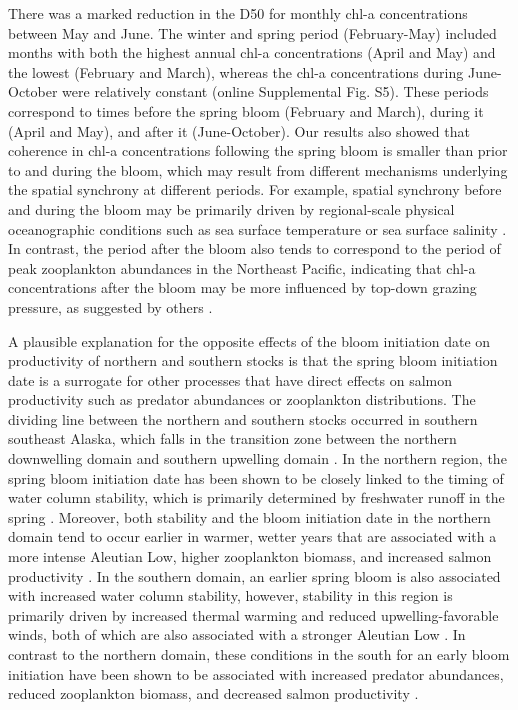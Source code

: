 There was a marked reduction in the D50 for monthly chl-a concentrations between
May and June. The winter and spring period (February-May) included months with
both the highest annual chl-a concentrations (April and May) and the lowest
(February and March), whereas the chl-a concentrations during June-October were
relatively constant (online Supplemental Fig. S5). These periods correspond to
times before the spring bloom (February and March), during it (April and May),
and after it (June-October). Our results also showed that coherence in chl-a
concentrations following the spring bloom is smaller than prior to and during
the bloom, which may result from different mechanisms underlying the spatial
synchrony at different periods. For example, spatial synchrony before and during
the bloom may be primarily driven by regional-scale physical oceanographic
conditions such as sea surface temperature or sea surface salinity
\citep{Henson2007a}. In contrast, the period after the bloom also tends to
correspond to the period of peak zooplankton abundances in the Northeast
Pacific, indicating that chl-a concentrations after the bloom may be more
influenced by top-down grazing pressure, as suggested by others
\citep{Chittenden2010a, Bornhold2000, Mackas2012}.

A plausible explanation for the opposite effects of the bloom initiation date on
productivity of northern and southern stocks is that the spring bloom initiation
date is a surrogate for other processes that have direct effects on salmon
productivity such as predator abundances or zooplankton distributions. The
dividing line between the northern and southern stocks occurred in southern
southeast Alaska, which falls in the transition zone between the northern
downwelling domain and southern upwelling domain \citep{Ware1989a}. In the
northern region, the spring bloom initiation date has been shown to be closely
linked to the timing of water column stability, which is primarily determined by
freshwater runoff in the spring \citep{Weingartner2005a, Henson2007a}. Moreover,
both stability and the bloom initiation date in the northern domain tend to
occur earlier in warmer, wetter years that are associated with a more intense
Aleutian Low, higher zooplankton biomass, and increased salmon productivity
\citep{Brodeur1992a, Mueter2002a}. In the southern domain, an earlier spring
bloom is also associated with increased water column stability, however,
stability in this region is primarily driven by increased thermal warming and
reduced upwelling-favorable winds, both of which are also associated with a
stronger Aleutian Low \citep{Polovina1995a, Henson2007a}. In contrast to the
northern domain, these conditions in the south for an early bloom initiation
have been shown to be associated with increased predator abundances, reduced
zooplankton biomass, and decreased salmon productivity \citep{Ware1995a,
Mackas2001a, Mueter2002a}.

